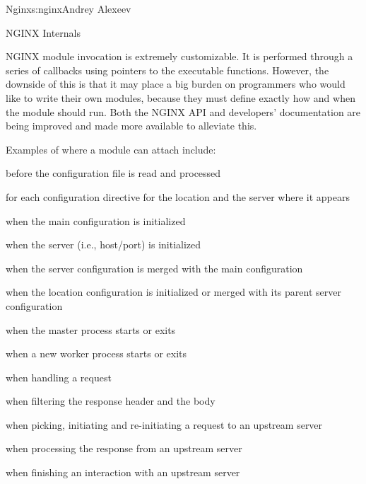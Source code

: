 \begin{aosachapter}{Nginx}{s:nginx}{Andrey Alexeev}
\begin{aosasect1}{NGINX Internals}
\begin{aosaenumerate}
\end{aosaenumerate}

NGINX module invocation is extremely customizable. It is performed
through a series of callbacks using pointers to the executable
functions. However, the downside of this is that it may place a big
burden on programmers who would like to write their own modules,
because they must define exactly how and when the module should
run. Both the NGINX API and developers' documentation are being
improved and made more available to alleviate this.

Examples of where a module can attach include:

\begin{aosaitemize}

\item before the configuration file is read and processed

\item for each configuration directive for the location and the server
  where it appears

\item when the main configuration is initialized

\item when the server (i.e., host/port) is initialized

\item when the server configuration is merged with the main
  configuration

\item when the location configuration is initialized or merged with
  its parent server configuration

\item when the master process starts or exits

\item when a new worker process starts or exits

\item when handling a request

\item when filtering the response header and the body

\item when picking, initiating and re-initiating a request to an
  upstream server

\item when processing the response from an upstream server

\item when finishing an interaction with an upstream server


\end{aosaitemize}
\end{aosasect1}
\end{aosachapter}
